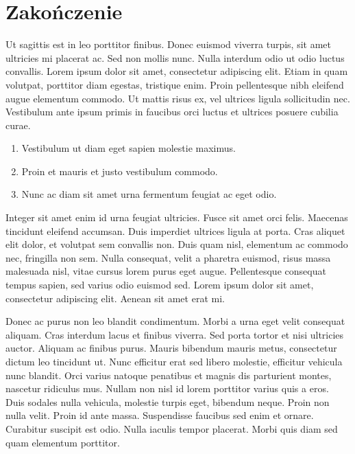 \documentclass[polish,engineering]{wizthesis}
\begin{document}
{\backmatter %
\chapter{Zakończenie}

Ut sagittis est in leo porttitor finibus. Donec euismod viverra turpis, sit amet
ultricies mi placerat ac. Sed non mollis nunc. Nulla interdum odio ut odio
luctus convallis. Lorem ipsum dolor sit amet, consectetur adipiscing elit. Etiam
in quam volutpat, porttitor diam egestas, tristique enim. Proin pellentesque
nibh eleifend augue elementum commodo. Ut mattis risus ex, vel ultrices ligula
sollicitudin nec. Vestibulum ante ipsum primis in faucibus orci luctus et
ultrices posuere cubilia curae.
\begin{enumerate}[noitemsep]
  \item Vestibulum ut diam eget sapien molestie maximus.
  \item Proin et mauris et justo vestibulum commodo.
  \item Nunc ac diam sit amet urna fermentum feugiat ac eget odio.
\end{enumerate}
Integer sit amet enim id urna feugiat ultricies. Fusce sit amet orci felis.
Maecenas tincidunt eleifend accumsan. Duis imperdiet ultrices ligula at porta.
Cras aliquet elit dolor, et volutpat sem convallis non. Duis quam nisl,
elementum ac commodo nec, fringilla non sem. Nulla consequat, velit a pharetra
euismod, risus massa malesuada nisl, vitae cursus lorem purus eget augue.
Pellentesque consequat tempus sapien, sed varius odio euismod sed. Lorem ipsum
dolor sit amet, consectetur adipiscing elit. Aenean sit amet erat mi.

Donec ac purus non leo blandit condimentum. Morbi a urna eget velit consequat
aliquam. Cras interdum lacus et finibus viverra. Sed porta tortor et nisi
ultricies auctor. Aliquam ac finibus purus. Mauris bibendum mauris metus,
consectetur dictum leo tincidunt ut. Nunc efficitur erat sed libero molestie,
efficitur vehicula nunc blandit. Orci varius natoque penatibus et magnis dis
parturient montes, nascetur ridiculus mus. Nullam non nisl id lorem porttitor
varius quis a eros. Duis sodales nulla vehicula, molestie turpis eget, bibendum
neque. Proin non nulla velit. Proin id ante massa. Suspendisse faucibus sed enim
et ornare. Curabitur suscipit est odio. Nulla iaculis tempor placerat. Morbi
quis diam sed quam elementum porttitor.
}


\end{document}
